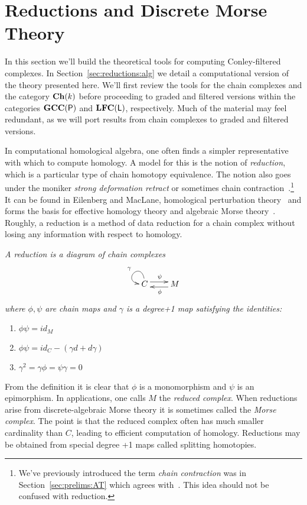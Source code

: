 

\section{Reductions and Discrete Morse Theory}\label{sec:reductions}

In this section we'll build the theoretical tools for computing Conley-filtered complexes.  In Section~\ref{sec:reductions:alg} we detail a computational version of the theory presented here.  We'll first review the tools for the chain complexes and the category ${\bf Ch}(k)$ before proceeding to graded and filtered versions within the categories ${\bf GCC}({\mathsf P})$ and ${\bf LFC}({\mathsf L})$, respectively.  Much of the material may feel redundant, as we will port results from chain complexes to graded and filtered versions.


  In computational homological algebra, one often finds a simpler representative with which to compute homology.  A model for this is the notion of {\em reduction}, which is a particular type of chain homotopy equivalence.  The notion also goes under the moniker {\em strong deformation retract} or sometimes chain contraction~\cite{sko2}.\footnote{We've previously introduced the term {\em chain contraction} was  in Section~\ref{sec:prelims:AT} which agrees with~\cite{weibel}.  This idea should not be confused with reduction.}  It can be found in Eilenberg and MacLane, homological perturbation theory~\cite{barnes:lambe} and forms the basis for effective homology theory and algebraic Morse theory~\cite{sko,sko2}.  Roughly, a reduction is a method of data reduction for a chain complex without losing any information with respect to homology.

\begin{defn}
{\em A {\em reduction} is a diagram of chain complexes
\[
\xymatrixrowsep{0.03in}
\xymatrixcolsep{0.3in}
\xymatrix{
C  \ar@(u,l)_{\gamma}  \ar[r]<3pt>^{\psi} & \ar[l]<3pt>^{\phi} M
}
\]
where $\phi,\psi$ are chain maps and $\gamma$ is a degree+1 map satisfying the identities:
\begin{enumerate}
\item $\phi\psi = id_M$
\item $\phi\psi = id_C-(\gamma d+d\gamma)$
\item $\gamma^2 = \gamma\phi = \psi\gamma = 0$
\end{enumerate}
}
\end{defn}

 From the definition it is clear that $\phi$ is a monomorphism and $\psi$ is an epimorphism.  In applications, one calls $M$ the {\em reduced complex}.  When reductions arise from discrete-algebraic Morse theory it is sometimes called the {\em Morse complex}.  The point is that the reduced complex often has much smaller cardinality than $C$, leading to efficient computation of homology.  Reductions may be obtained from special degree +1 maps called splitting homotopies.

